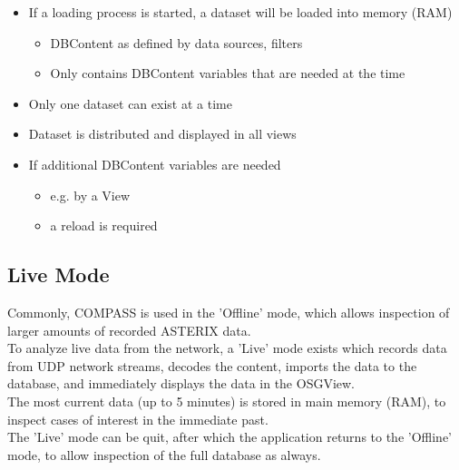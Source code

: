 \begin{itemize}
\item If a loading process is started, a dataset will be loaded into memory (RAM)
\begin{itemize}
\item DBContent as defined by data sources, filters
\item Only contains DBContent variables that are needed at the time
\end{itemize}
\item Only one dataset can exist at a time
\item Dataset is distributed and displayed in all views
\item If additional DBContent variables are needed
\begin{itemize}
\item e.g. by a View
\item a reload is required
\end{itemize}
\end{itemize}

\subsection*{Live Mode}
Commonly, COMPASS is used in the 'Offline' mode, which allows inspection of larger amounts of recorded ASTERIX data. \\

To analyze live data from the network, a 'Live' mode exists which records data from UDP network streams, decodes the content, imports the data to the database, and immediately displays the data in the OSGView. \\

The most current data (up to 5 minutes) is stored in main memory (RAM), to inspect cases of interest in the immediate past. \\

The 'Live' mode can be quit, after which the application returns to the 'Offline' mode, to allow inspection of the full database as always.

 
